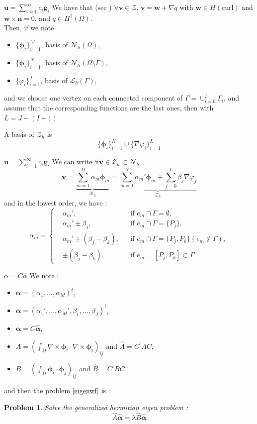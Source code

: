 \documentclass{beamer}
\newtheorem{pb}{Problem}
\newcommand{\Z}{{\bm{\mathcal{Z}}}}
\newcommand{\NN}{{\bm{\mathcal{N}}}}
\newcommand{\LLL}{{\bm{\mathcal{L}}}}
\newcommand{\grad}{{\nabla}}
\newcommand{\curl}{{\nabla\times}}
\begin{document}
\begin{frame}{$\mathbf{u}=\sum_{i=1}^\infty c_i\mathbf{g}_i$}
  We have that (see \cite{girault90-1}) $\forall\mathbf{v}\in\Z$, $\mathbf{v}=\mathbf{w}+\grad q$ with $\mathbf{w}\in H(\mathrm{curl})$ and $\mathbf{w}\times\mathbf{n}=0$, and $q \in H^1(\Omega)$.\\
  Then, if we note
  \begin{itemize}
  \item $\{\bm{\phi}_i\}_{i=1}^M$, basis of $\NN_h(\Omega)$,
  \item $\{\bm{\phi}_i\}_{i=1}^N$, basis of $\NN_h(\Omega\setminus\Gamma)$,
  \item $\{\varphi_i\}_{i=1}^J$, basis of $\LLL_h(\Gamma)$,
  \end{itemize}
  and we choose one vertex on each connected component of $\Gamma=\cup_{i=0}^I\Gamma_i$, and assume that the corresponding functions are the last ones, then with $L=J-(I+1)$
  \begin{block}{A basis of $\Z_h$ is}
    \[ \{\bm{\phi}_i\}_{i=1}^N\cup\{\grad\varphi_i\}_{i=1}^L \]
  \end{block}
\end{frame}

\begin{frame}{$\mathbf{u}=\sum_{i=1}^\infty c_i\mathbf{g}_i$}
  We can write $\forall \mathbf{v}\in \Z_h \subset \NN_h$
  \[ \mathbf{v}=\underbrace{\sum_{m=1}^M\alpha_m\bm{\phi}_m}_{\NN_h}=\underbrace{\sum_{m=1}^N\alpha_m'\bm{\phi}_m+ \sum_{j=0}^L \beta_j\grad\varphi_j}_{\Z_h} \]
  and in the lowest order, we have :
  \[
  \alpha_m=\left\{\begin{aligned}
  &\alpha_m', &&\mbox{if } e_m\cap\Gamma = \emptyset,\\
  &\alpha_m'\pm \beta_j, &&\mbox{if } e_m\cap\Gamma = \{P_j\},\\
  &\alpha_m'\pm (\beta_j-\beta_k), &&\mbox{if } e_m\cap\Gamma = \{P_j,P_k\}
  (e_m\notin\Gamma),\\
  &\pm (\beta_j-\beta_k), &&\mbox{if } e_m=[P_j,P_k]\subset\Gamma
  \end{aligned}\right.
  \]
\end{frame}

\begin{frame}{$\alpha=C\widehat{\alpha}$}
  We note :
  \begin{itemize}
  \item $\bm{\alpha}=(\alpha_1,\dots,\alpha_M)^t$,
  \item $\widehat{\bm{\alpha}}=(\alpha_1',\dots,\alpha_M',\beta_1,\dots,\beta_J)^t$,
  \item $\bm{\alpha} = C\widehat{\bm{\alpha}}$,
  \item $A=(\int_\Omega\curl\bm{\phi}_i\cdot\curl\bm{\phi}_j)_{ij}$ and $\widehat{A}=C^tAC$,
  \item $B=(\int_\Omega\bm{\phi}_i\cdot\bm{\phi}_j)_{ij}$ and $\widehat{B}=C^tBC$
  \end{itemize}
  and then the problem \ref{eigenwf} is :
  \begin{pb}
    Solve the generalized hermitian eigen problem :
    \[ \widehat{A}\widehat{\bm{\alpha}}=\lambda \widehat{B}\widehat{\bm{\alpha}} \]
  \end{pb}
\end{frame}
\end{document}
